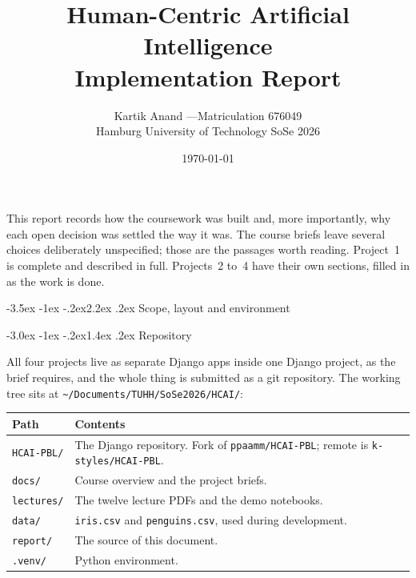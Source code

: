 \documentclass[11pt,a4paper]{article}
\title{\vspace{-1.4cm}\sffamily\color{accent}\bfseries
       Human-Centric Artificial Intelligence\\[0.25em]
       \Large\mdseries Implementation Report}
\author{Kartik Anand \quad---\quad Matriculation 676049\\[0.3em]
        \small Hamburg University of Technology \quad SoSe 2026}
\date{\small \today}
\makeatletter
\renewcommand\section{\@startsection{section}{1}{\z@}%
  {-3.5ex \@plus -1ex \@minus -.2ex}{2.2ex \@plus.2ex}%
  {\normalfont\Large\sffamily\bfseries\color{accent}}}
\renewcommand\subsection{\@startsection{subsection}{2}{\z@}%
  {-3.0ex \@plus -1ex \@minus -.2ex}{1.4ex \@plus .2ex}%
  {\normalfont\large\sffamily\bfseries\color{accent}}}
\newenvironment{callout}[1][notebg]
  {\par\medskip\begin{lrbox}{\calloutbuf}%
   \begin{minipage}{\dimexpr\linewidth-24pt\relax}\setlength{\parskip}{0.4em}}
  {\end{minipage}\end{lrbox}%
   \noindent\colorbox{notebg}{\hspace{4pt}\usebox{\calloutbuf}\hspace{4pt}}\par\medskip}
\newcommand{\file}[1]{\texttt{\small #1}}
\makeatother
\begin{document}
\maketitle
\thispagestyle{fancy}

\begin{callout}
This report records how the coursework was built and, more importantly, why each
open decision was settled the way it was. The course briefs leave several choices
deliberately unspecified; those are the passages worth reading. Project~1 is
complete and described in full. Projects~2 to~4 have their own sections, filled in
as the work is done.
\end{callout}

\tableofcontents

\vspace{1em}

\section{Scope, layout and environment}

\subsection{Repository}

All four projects live as separate Django apps inside one Django project, as the
brief requires, and the whole thing is submitted as a git repository. The working
tree sits at \file{\textasciitilde/Documents/TUHH/SoSe2026/HCAI/}:

\begin{center}
\begin{tabularx}{0.94\textwidth}{@{}lX@{}}
\toprule
\textbf{Path} & \textbf{Contents} \\
\midrule
\file{HCAI-PBL/}   & The Django repository. Fork of \file{ppaamm/HCAI-PBL}; remote is \file{k-styles/HCAI-PBL}. \\
\file{docs/}       & Course overview and the project briefs. \\
\file{lectures/}   & The twelve lecture PDFs and the demo notebooks. \\
\file{data/}       & \file{iris.csv} and \file{penguins.csv}, used during development. \\
\file{report/}     & The source of this document. \\
\file{.venv/}      & Python environment. \\
\bottomrule
\end{tabularx}
\end{center}
\end{document}
